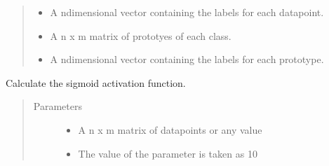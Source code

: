 \documentclass[letterpaper,10pt,english]{sphinxmanual}
\begin{document}
\begin{fulllineitems}
\begin{fulllineitems}
\begin{quote}
\begin{description}
\begin{itemize}
\item {} 
\sphinxAtStartPar
{} \textendash{} A n\sphinxhyphen{}dimensional vector containing the labels for each datapoint.

\item {} 
\sphinxAtStartPar
{} \textendash{} A n x m matrix of prototyes of each class.

\item {} 
\sphinxAtStartPar
{} \textendash{} A n\sphinxhyphen{}dimensional vector containing the labels for each prototype.

\end{itemize}

\end{description}\end{quote}

\end{fulllineitems}


\begin{fulllineitems}
\label{\detokenize{Renyi_final:Renyi_final.GLVQ.prototype_data_labels}}
\end{fulllineitems}


\begin{fulllineitems}
\label{\detokenize{Renyi_final:Renyi_final.GLVQ.sigmoid_calc}}
\sphinxAtStartPar
Calculate the sigmoid activation function.
\begin{quote}\begin{description}
\item[{Parameters}] \leavevmode\begin{itemize}
\item {} 
\sphinxAtStartPar
{} \textendash{} A n x m matrix of datapoints or any value

\item {} 
\sphinxAtStartPar
{} \textendash{} The value of the parameter is taken as 10


\end{itemize}
\end{description}
\end{quote}
\end{fulllineitems}
\end{fulllineitems}
\end{document}

